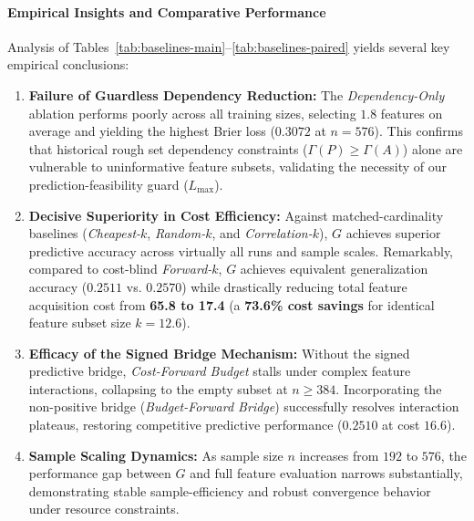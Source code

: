 \paragraph{Empirical Insights and Comparative Performance}
Analysis of Tables~\ref{tab:baselines-main}--\ref{tab:baselines-paired} yields several key empirical conclusions:
\begin{enumerate}[label=(\arabic*), leftmargin=*]
	\item \textbf{Failure of Guardless Dependency Reduction:} The \textit{Dependency-Only} ablation performs poorly across all training sizes, selecting $1.8$ features on average and yielding the highest Brier loss ($0.3072$ at $n=576$). This confirms that historical rough set dependency constraints ($\Gamma(P) \ge \Gamma(A)$) alone are vulnerable to uninformative feature subsets, validating the necessity of our prediction-feasibility guard ($L_{\max}$).
	\item \textbf{Decisive Superiority in Cost Efficiency:} Against matched-cardinality baselines (\textit{Cheapest-$k$}, \textit{Random-$k$}, and \textit{Correlation-$k$}), $G$ achieves superior predictive accuracy across virtually all runs and sample scales. Remarkably, compared to cost-blind \textit{Forward-$k$}, $G$ achieves equivalent generalization accuracy ($0.2511$ vs. $0.2570$) while drastically reducing total feature acquisition cost from \textbf{65.8 to 17.4} (a \textbf{73.6\% cost savings} for identical feature subset size $k=12.6$).
	\item \textbf{Efficacy of the Signed Bridge Mechanism:} Without the signed predictive bridge, \textit{Cost-Forward Budget} stalls under complex feature interactions, collapsing to the empty subset at $n \ge 384$. Incorporating the non-positive bridge (\textit{Budget-Forward Bridge}) successfully resolves interaction plateaus, restoring competitive predictive performance ($0.2510$ at cost $16.6$).
	\item \textbf{Sample Scaling Dynamics:} As sample size $n$ increases from $192$ to $576$, the performance gap between $G$ and full feature evaluation narrows substantially, demonstrating stable sample-efficiency and robust convergence behavior under resource constraints.
\end{enumerate}